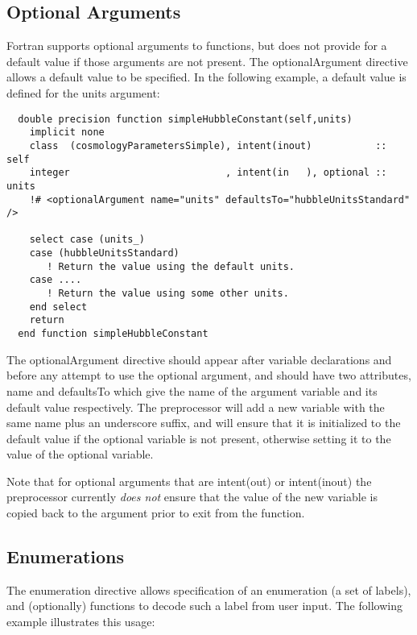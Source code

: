 \subsection{Optional Arguments}

Fortran supports optional arguments to functions, but does not provide for a default value if those arguments are not present. The {\normalfont \ttfamily optionalArgument} directive allows a default value to be specified. In the following example, a default value is defined for the {\normalfont \ttfamily units} argument:

\begin{lstlisting}
  double precision function simpleHubbleConstant(self,units)
    implicit none
    class  (cosmologyParametersSimple), intent(inout)           :: self
    integer                           , intent(in   ), optional :: units
    !# <optionalArgument name="units" defaultsTo="hubbleUnitsStandard" />

    select case (units_)
    case (hubbleUnitsStandard)
       ! Return the value using the default units.
    case ....
       ! Return the value using some other units.
    end select
    return
  end function simpleHubbleConstant
\end{lstlisting}
The {\normalfont \ttfamily optionalArgument} directive should appear after variable declarations and before any attempt to use the optional argument, and should have two attributes, {\normalfont \ttfamily name} and {\normalfont \ttfamily defaultsTo} which give the name of the argument variable and its default value respectively. The preprocessor will add a new variable with the same name plus an underscore suffix, and will ensure that it is initialized to the default value if the optional variable is not present, otherwise setting it to the value of the optional variable.

Note that for optional arguments that are {\normalfont \ttfamily intent(out)} or {\normalfont \ttfamily intent(inout)} the preprocessor currently \emph{does not} ensure that the value of the new variable is copied back to the argument prior to exit from the function.

\subsection{Enumerations}

The {\normalfont \ttfamily enumeration} directive allows specification of an enumeration (a set of labels), and (optionally) functions to decode such a label from user input. The following example illustrates this usage:

